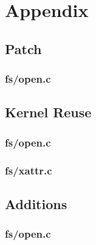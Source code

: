 \section{Appendix}

\subsection{Patch}

\subsubsection*{fs/open.c}



\subsection{Kernel Reuse}

\subsubsection*{fs/open.c}



\subsubsection*{fs/xattr.c}



\subsection{Additions}

\subsubsection*{fs/open.c}

